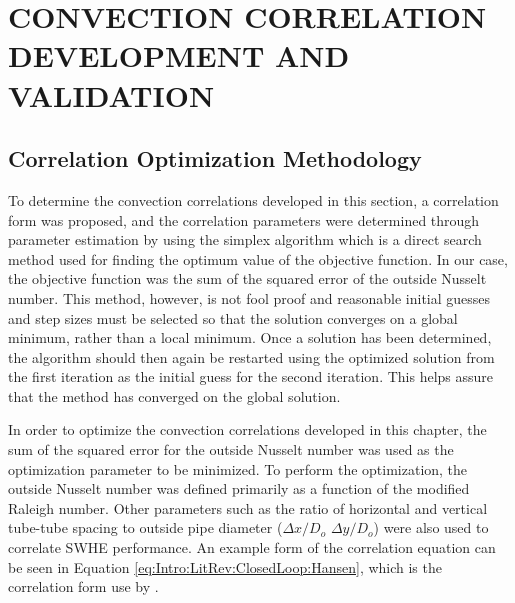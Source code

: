 \chapter{CONVECTION CORRELATION DEVELOPMENT AND VALIDATION}
\label{ch:Correlation}

\section{Correlation Optimization Methodology}
\label{sec:Correlation:Development:NelderMead}
	
To determine the convection correlations developed in this section, a correlation form was proposed, and the correlation parameters were determined through parameter estimation by using the \cite{NelderMead1965} simplex algorithm which is a direct search method used for finding the optimum value of the objective function. In our case, the objective function was the sum of the squared error of the outside Nusselt number. This method, however, is not fool proof and reasonable initial guesses and step sizes must be selected so that the solution converges on a global minimum, rather than a local minimum. Once a solution has been determined, the algorithm should then again be restarted using the optimized solution from the first iteration as the initial guess for the second iteration. This helps assure that the method has converged on the global solution.	
	

In order to optimize the convection correlations developed in this chapter, the sum of the squared error for the outside Nusselt number was used as the optimization parameter to be minimized. To perform the optimization, the outside Nusselt number was defined primarily as a function of the modified Raleigh number. Other parameters such as the ratio of horizontal and vertical tube-tube spacing to outside pipe diameter ($\Delta x / D_o$ $\Delta y / D_o$) were also used to correlate SWHE performance. An example form of the correlation equation can be seen in Equation \ref{eq:Intro:LitRev:ClosedLoop:Hansen}, which is the correlation form use by \cite{Hansen2011}.

